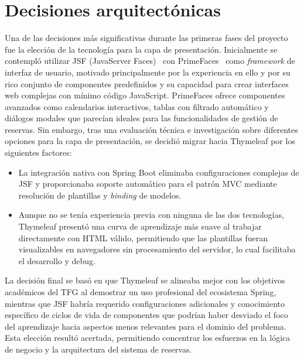 \section{Decisiones arquitectónicas}\label{decisiones-arquitectonicas}
Una de las decisiones más significativas durante las primeras fases del proyecto fue la elección de la tecnología para la capa de presentación. Inicialmente se contempló utilizar JSF (JavaServer Faces)~\cite{jsf} con PrimeFaces~\cite{primefaces} como \emph{framework} de interfaz de usuario, motivado principalmente por la experiencia en ello y por su rico conjunto de componentes predefinidos y su capacidad para crear interfaces web complejas con mínimo código JavaScript. PrimeFaces ofrece componentes avanzados como calendarios interactivos, tablas con filtrado automático y diálogos modales que parecían ideales para las funcionalidades de gestión de reservas.
Sin embargo, tras una evaluación técnica e investigación sobre diferentes opciones para la capa de presentación, se decidió migrar hacia Thymeleaf por los siguientes factores:
\begin{itemize}
\tightlist
\item
La integración nativa con Spring Boot eliminaba configuraciones complejas de JSF y proporcionaba soporte automático para el patrón MVC mediante resolución de plantillas y \emph{binding} de modelos.
\item
Aunque no se tenía experiencia previa con ninguna de las dos tecnologías, Thymeleaf presentó una curva de aprendizaje más suave al trabajar directamente con HTML válido, permitiendo que las plantillas fueran visualizables en navegadores sin procesamiento del servidor, lo cual facilitaba el desarrollo y debug.
\end{itemize}
La decisión final se basó en que Thymeleaf se alineaba mejor con los objetivos académicos del TFG al demostrar un uso profesional del ecosistema Spring, mientras que JSF habría requerido configuraciones adicionales y conocimiento específico de ciclos de vida de componentes que podrían haber desviado el foco del aprendizaje hacia aspectos menos relevantes para el dominio del problema. Esta elección resultó acertada, permitiendo concentrar los esfuerzos en la lógica de negocio y la arquitectura del sistema de reservas.\\


